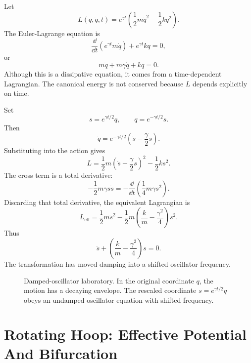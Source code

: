Let
\[
  L(q,\dot q,t)
  =
  e^{\gamma t}
  \left(
    \frac12m\dot q^2-\frac12kq^2
  \right).
\]
The Euler-Lagrange equation is
\[
  \frac{\dd}{\dd t}(e^{\gamma t}m\dot q)+e^{\gamma t}kq=0,
\]
or
\[
  \boxed{
  m\ddot q+m\gamma\dot q+kq=0.
  }
\]
Although this is a dissipative equation, it comes from a time-dependent
Lagrangian. The canonical energy is not conserved because \(L\) depends
explicitly on time.

Set
\[
  s=e^{\gamma t/2}q,
  \qquad
  q=e^{-\gamma t/2}s.
\]
Then
\[
  \dot q=e^{-\gamma t/2}\left(\dot s-\frac{\gamma}{2}s\right).
\]
Substituting into the action gives
\[
  L
  =
  \frac12m\left(\dot s-\frac{\gamma}{2}s\right)^2
  -
  \frac12ks^2.
\]
The cross term is a total derivative:
\[
  -\frac12m\gamma s\dot s
  =
  -\frac{\dd}{\dd t}\left(\frac14m\gamma s^2\right).
\]
Discarding that total derivative, the equivalent Lagrangian is
\[
  L_{\mathrm{eff}}
  =
  \frac12m\dot s^2
  -
  \frac12m
  \left(
    \frac{k}{m}-\frac{\gamma^2}{4}
  \right)s^2.
\]
Thus
\[
  \ddot s+\left(\frac{k}{m}-\frac{\gamma^2}{4}\right)s=0.
\]
The transformation has moved damping into a shifted oscillator frequency.

\begin{figure}[htbp]
\centering
{}
\caption{Damped-oscillator laboratory. In the original coordinate \(q\), the
motion has a decaying envelope. The rescaled coordinate \(s=e^{\gamma t/2}q\)
obeys an undamped oscillator equation with shifted frequency.}
\label{fig:lab-damped-oscillator-rescaling}
\end{figure}
\FloatBarrier

\section{Rotating Hoop: Effective Potential And Bifurcation}
\label{sec:lab-rotating-hoop}

